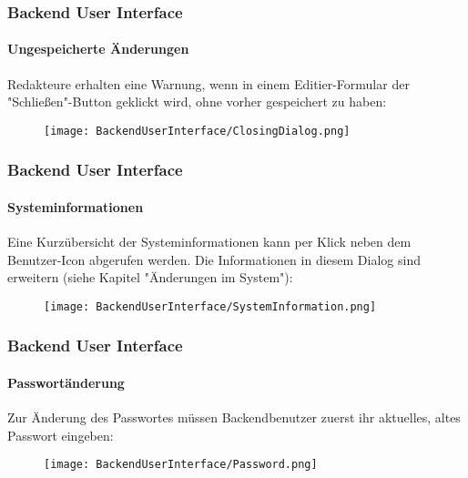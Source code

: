 \begin{frame}[fragile]
	\frametitle{Backend User Interface}
	\framesubtitle{Ungespeicherte Änderungen}

	Redakteure erhalten eine Warnung, wenn in einem Editier-Formular der "Schließen"-Button
	geklickt wird, ohne vorher gespeichert zu haben:

	\begin{figure}
		\texttt{[image: BackendUserInterface/ClosingDialog.png]}
	\end{figure}

\end{frame}

\begin{frame}[fragile]
	\frametitle{Backend User Interface}
	\framesubtitle{Systeminformationen}

	Eine Kurzübersicht der Systeminformationen kann per Klick neben dem Benutzer-Icon
	abgerufen werden. Die Informationen in diesem Dialog sind erweitern (siehe Kapitel
	"Änderungen im System"):

	\begin{figure}
		\texttt{[image: BackendUserInterface/SystemInformation.png]}
	\end{figure}

\end{frame}

\begin{frame}[fragile]
	\frametitle{Backend User Interface}
	\framesubtitle{Passwortänderung}

	Zur Änderung des Passwortes müssen Backendbenutzer zuerst ihr aktuelles, altes
	Passwort eingeben:

	\begin{figure}
		\texttt{[image: BackendUserInterface/Password.png]}
	\end{figure}

\end{frame}

